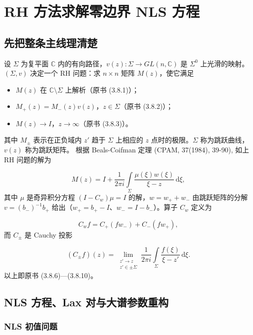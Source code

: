 \documentclass[
    lang=cn,
    scheme=chinese,
    mode=simple,
    device=normal,
    color=blue,
    math=cm,
    thmcnt=section,
    12pt
]{elegantbook}
\begin{document}
\setcounter{chapter}{4}

\chapter{RH 方法求解零边界 NLS 方程}

\section*{先把整条主线理清楚}

\begin{callout}
    设 $\Sigma$ 为复平面 $\mathbb{C}$ 内的有向路径，$v(z):\Sigma\to GL(n,\mathbb{C})$ 是 $\Sigma^0$ 上光滑的映射。
    $(\Sigma,v)$ 决定一个 RH 问题：求 $n\times n$ 矩阵 $M(z)$，使它满足

    \begin{itemize}
        \item $M(z)$ 在 $\mathbb{C}\setminus\Sigma$ 上解析（原书 (3.8.1)）；
        \item $M_+(z)=M_-(z)v(z)$，$z\in\Sigma$（原书 (3.8.2)）；
        \item $M(z)\to I$，$z\to\infty$（原书 (3.8.3)）。
    \end{itemize}

    其中 $M_\pm$ 表示在正负域内 $z'$ 趋于 $\Sigma$ 上相应的 $z$ 点时的极限。$\Sigma$ 称为跳跃曲线，$v(z)$ 称为跳跃矩阵。
    根据 Beals-Coifman 定理 (CPAM, 37(1984), 39-90), 如上 RH 问题的解为

    \[
        M(z)
        =
        I+\dfrac{1}{2\pi i}\int\limits_\Sigma\dfrac{\mu(\xi)w(\xi)}{\xi-z}\,\mathrm d\xi,
    \]
    其中 $\mu$ 是奇异积分方程 $(I-C_w)\mu=I$ 的解，$w=w_++w_-$ 由跳跃矩阵的分解 $v=(b_-)^{-1}b_+$ 给出（$w_+=b_+-I$、$w_-=I-b_-$）。算子 $C_w$ 定义为

    \[
        C_wf=C_+(fw_-)+C_-(fw_+),
    \]
    而 $C_\pm$ 是 Cauchy 投影

    \[
        (C_\pm f)(z)=\lim\limits_{\substack{z'\to z\\ z'\in\pm\Sigma}}\dfrac{1}{2\pi i}\int\limits_\Sigma\dfrac{f(\xi)}{\xi-z'}\,\mathrm d\xi.
    \]
    以上即原书 (3.8.6)---(3.8.10)。
\end{callout}

\section{NLS 方程、Lax 对与大谱参数重构}

\subsection{NLS 初值问题}
\end{document}
